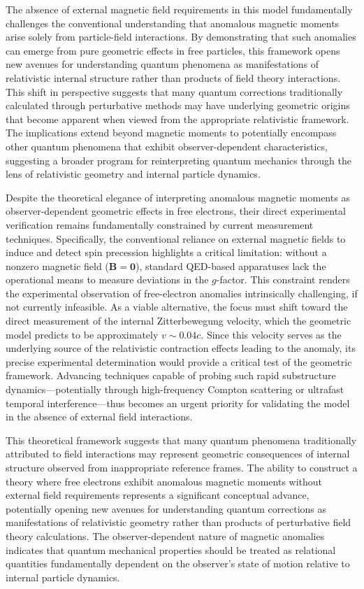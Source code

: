 \documentclass[%
 reprint,
 amsmath,amssymb,
 aps,
]{revtex4-1}
\numberwithin{equation}{section}%
\begin{document}
The absence of external magnetic field requirements in this model fundamentally challenges the conventional understanding that anomalous magnetic moments arise solely from particle-field interactions. By demonstrating that such anomalies can emerge from pure geometric effects in free particles, this framework opens new avenues for understanding quantum phenomena as manifestations of relativistic internal structure rather than products of field theory interactions. This shift in perspective suggests that many quantum corrections traditionally calculated through perturbative methods may have underlying geometric origins that become apparent when viewed from the appropriate relativistic framework. The implications extend beyond magnetic moments to potentially encompass other quantum phenomena that exhibit observer-dependent characteristics, suggesting a broader program for reinterpreting quantum mechanics through the lens of relativistic geometry and internal particle dynamics.

Despite the theoretical elegance of interpreting anomalous magnetic moments as observer-dependent geometric effects in free electrons, their direct experimental verification remains fundamentally constrained by current measurement techniques. Specifically, the conventional reliance on external magnetic fields to induce and detect spin precession highlights a critical limitation: without a nonzero magnetic field ($\mathbf{B} = \mathbf{0}$), standard QED-based apparatuses lack the operational means to measure deviations in the $g$-factor. This constraint renders the experimental observation of free-electron anomalies intrinsically challenging, if not currently infeasible. As a viable alternative, the focus must shift toward the direct measurement of the internal Zitterbewegung velocity, which the geometric model predicts to be approximately $v \sim 0.04c$. Since this velocity serves as the underlying source of the relativistic contraction effects leading to the anomaly, its precise experimental determination would provide a critical test of the geometric framework. Advancing techniques capable of probing such rapid substructure dynamics---potentially through high-frequency Compton scattering or ultrafast temporal interference---thus becomes an urgent priority for validating the model in the absence of external field interactions.

This theoretical framework suggests that many quantum phenomena traditionally attributed to field interactions may represent geometric consequences of internal structure observed from inappropriate reference frames. The ability to construct a theory where free electrons exhibit anomalous magnetic moments without external field requirements represents a significant conceptual advance, potentially opening new avenues for understanding quantum corrections as manifestations of relativistic geometry rather than products of perturbative field theory calculations. The observer-dependent nature of magnetic anomalies indicates that quantum mechanical properties should be treated as relational quantities fundamentally dependent on the observer's state of motion relative to internal particle dynamics.
\end{document}
